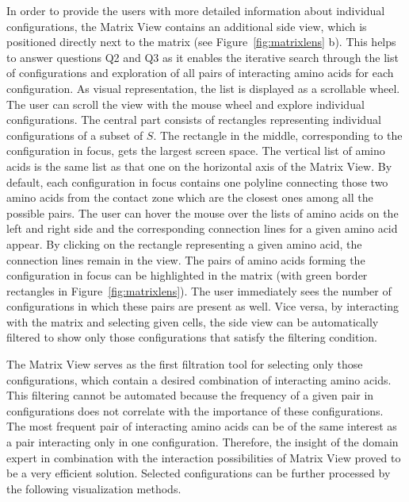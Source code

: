 \documentclass[twocolumn]{bmcart}%
\def\MatView {Matrix View\xspace}
\begin{document}
In order to provide the users with more detailed information about individual configurations, the \MatView contains an additional side view, which is positioned directly next to the matrix (see Figure~\ref{fig:matrixlens} b).
This helps to answer questions Q2 and Q3 as it enables the iterative search through the list of configurations and exploration of all pairs of interacting amino acids for each configuration.
As visual representation, the list is displayed as a scrollable wheel.
The user can scroll the view with the mouse wheel and explore individual configurations.
The central part consists of rectangles representing individual configurations of a subset of $S$.
The rectangle in the middle, corresponding to the configuration in focus, gets the largest screen space.
The vertical list of amino acids is the same list as that one on the horizontal axis of the \MatView.
By default, each configuration in focus contains one polyline connecting those two amino acids from the contact zone which are the closest ones among all the possible pairs.
The user can hover the mouse over the lists of amino acids on the left and right side and the corresponding connection lines for a given amino acid appear.
By clicking on the rectangle representing a given amino acid, the connection lines remain in the view. 
The pairs of amino acids forming the configuration in focus can be highlighted in the matrix (with green border rectangles in Figure~\ref{fig:matrixlens}).
The user immediately sees the number of configurations in which these pairs are present as well.
Vice versa, by interacting with the matrix and selecting given cells, the side view can be automatically filtered to show only those configurations that satisfy the filtering condition.

The \MatView serves as the first filtration tool for selecting only those configurations, which contain a desired combination of interacting amino acids.
This filtering cannot be automated because the frequency of a given pair in configurations does not correlate with the importance of these configurations.
The most frequent pair of interacting amino acids can be of the same interest as a pair interacting only in one configuration.
Therefore, the insight of the domain expert in combination with the interaction possibilities of \MatView proved to be a very efficient solution.
Selected configurations can be further processed by the following visualization methods.

\end{document}
